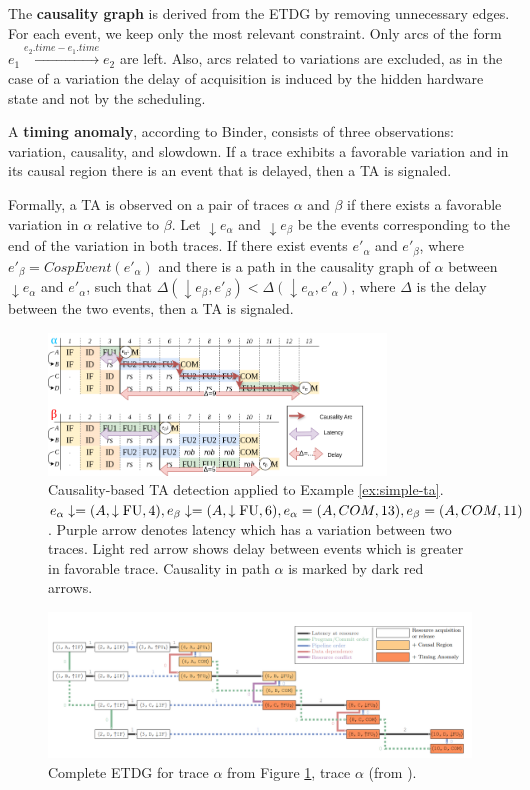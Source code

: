 The \textbf{causality graph} is derived from the ETDG by removing unnecessary edges. For each event, we keep only the most relevant constraint. Only arcs of the form $e_1 \xrightarrow{e_2.time - e_1.time} e_2$ are left. Also, arcs related to variations are excluded, as in the case of a variation the delay of acquisition is induced by the hidden hardware state and not by the scheduling.

A \textbf{timing anomaly}, according to Binder, consists of three observations: variation, causality, and slowdown. If a trace exhibits a favorable variation and in its causal region there is an event that is delayed, then a TA is signaled.

Formally, a TA is observed on a pair of traces $\alpha$ and $\beta$ if there exists a favorable variation in $\alpha$ relative to $\beta$. Let $\downarrow e_\alpha$ and $\downarrow e_\beta$ be the events corresponding to the end of the variation in both traces. If there exist events $e'_\alpha$ and $e'_\beta$, where $e'_\beta = CospEvent(e'_\alpha)$ and there is a path in the causality graph of $\alpha$ between $\downarrow e_\alpha$ and $e'_\alpha$, such that $\Delta(\downarrow e_\beta,e'_\beta) < \Delta(\downarrow e_\alpha,e'_\alpha)$, where $\Delta$ is the delay between the two events, then a TA is signaled.

\begin{figure}[htbp]
    \centering
    \includegraphics[width=0.8\textwidth]{figures/multiscalar_ta_causality.png}
    \caption{Causality-based TA detection applied to Example \ref{ex:simple-ta}. $e_\alpha\downarrow = (A, \downarrow\mathrm{FU}, 4), e_\beta\downarrow = (A, \downarrow\mathrm{FU}, 6), e_\alpha = (A, COM, 13), e_\beta = (A, COM, 11)$. Purple arrow denotes latency which has a variation between two traces. Light red arrow shows delay between events which is greater in favorable trace. Causality in path $\alpha$ is marked by dark red arrows.}
    \label{fig:multiscalar-ta-causality}
\end{figure}

\begin{figure}[htbp]
    \centering
    \includegraphics[width=\textwidth]{figures/ETDG.png}
    \caption{Complete ETDG for trace $\alpha$ from Figure \ref{fig:multiscalar-ta-causality}, trace $\alpha$ (from \cite{CAOTIC-report}).}
    \label{fig:ETDG}
\end{figure}

